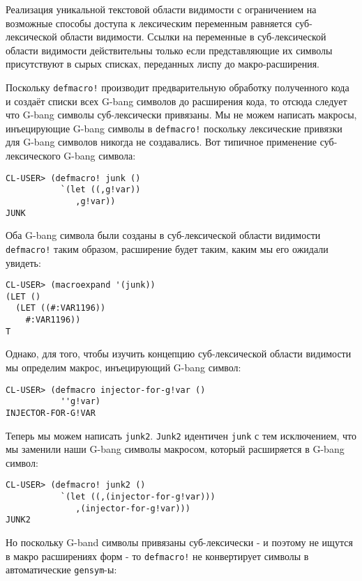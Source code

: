 Реализация уникальной текстовой области видимости с ограничением на возможные способы доступа к лексическим переменным равняется суб-лексической области видимости. Ссылки на переменные в суб-лексической области видимости действительны только если представляющие их символы присутствуют в сырых списках, переданных лиспу до макро-расширения.

Поскольку \verb"defmacro!" производит предварительную обработку полученного кода и создаёт списки всех G-bang символов до расширения кода, то отсюда следует что G-bang символы суб-лексически привязаны. Мы не можем написать макросы, инъецирующие G-bang символы в \verb"defmacro!" поскольку лексические привязки для G-bang символов никогда не создавались. Вот типичное применение суб-лексического G-bang символа:

\begin{verbatim}
CL-USER> (defmacro! junk ()
           `(let ((,g!var))
              ,g!var))
JUNK
\end{verbatim}

Оба G-bang символа были созданы в суб-лексической области видимости \verb"defmacro!" таким образом, расширение будет таким, каким мы его ожидали увидеть:

\begin{verbatim}
CL-USER> (macroexpand '(junk))
(LET ()
  (LET ((#:VAR1196))
    #:VAR1196))
T
\end{verbatim}

Однако, для того, чтобы изучить концепцию суб-лексической области видимости мы определим макрос, инъецирующий G-bang символ:

\begin{verbatim}
CL-USER> (defmacro injector-for-g!var ()
           ''g!var)
INJECTOR-FOR-G!VAR
\end{verbatim}

Теперь мы можем написать \verb"junk2". \verb"Junk2" идентичен \verb"junk" с тем исключением, что мы заменили наши G-bang символы макросом, который расширяется в G-bang символ:

\begin{verbatim}
CL-USER> (defmacro! junk2 ()
           `(let ((,(injector-for-g!var)))
              ,(injector-for-g!var)))
JUNK2
\end{verbatim}

Но поскольку G-band символы привязаны суб-лексически - и поэтому не ищутся в макро расширениях форм - то \verb"defmacro!" не конвертирует символы в автоматические \verb"gensym"-ы:


